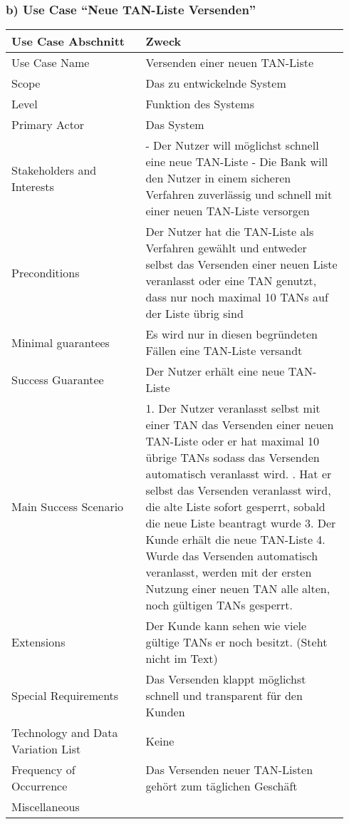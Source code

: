 \documentclass[a4paper,10pt]{article}
\begin{document}
\subsubsection*{b) Use Case ``Neue TAN-Liste Versenden''}
\begin{tabular}{|p{0.37\linewidth}|p{0.57\linewidth}|}
\hline
\textbf{Use Case Abschnitt} & \textbf{Zweck} \\
\hline
Use Case Name & Versenden einer neuen TAN-Liste\\
\hline
Scope & Das zu entwickelnde System\\
\hline
Level & Funktion des Systems\\
\hline
Primary Actor & Das System\\
\hline
Stakeholders and Interests & \-- Der Nutzer will möglichst schnell eine neue TAN-Liste \newline \-- Die Bank will den Nutzer in einem sicheren Verfahren zuverlässig und schnell mit einer neuen TAN-Liste versorgen\\
\hline
Preconditions & Der Nutzer hat die TAN-Liste als Verfahren gewählt und entweder selbst das Versenden einer neuen Liste veranlasst oder eine TAN genutzt, dass nur noch maximal 10 TANs auf der Liste übrig sind \\
\hline
Minimal guarantees & Es wird nur in diesen begründeten Fällen eine TAN-Liste versandt\\
\hline
Success Guarantee & Der Nutzer erhält eine neue TAN-Liste\\
\hline
Main Success Scenario & 1. Der Nutzer veranlasst selbst mit einer TAN das Versenden einer neuen TAN-Liste oder er hat maximal 10 übrige TANs sodass das Versenden automatisch veranlasst wird. \newline 2. Hat er selbst das Versenden veranlasst wird, die alte Liste sofort gesperrt, sobald die neue Liste beantragt wurde 3. Der Kunde erhält die neue TAN-Liste 4. Wurde das Versenden automatisch veranlasst, werden mit der ersten Nutzung einer neuen TAN alle alten, noch gültigen TANs gesperrt. \\
\hline
Extensions & Der Kunde kann sehen wie viele gültige TANs er noch besitzt. (Steht nicht im Text)\\
\hline
Special Requirements & Das Versenden klappt möglichst schnell und transparent für den Kunden\\
\hline
Technology and Data Variation List & Keine \\
\hline
Frequency of Occurrence & Das Versenden neuer TAN-Listen gehört zum täglichen Geschäft \\
\hline
Miscellaneous & \\
\hline
\hline
\end{tabular}
\end{document}
